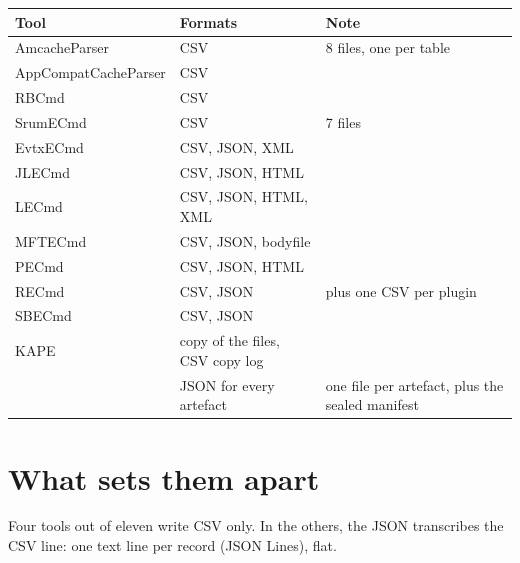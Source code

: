 \documentclass[11pt,a4paper,oneside]{report}
\begin{document}
\begin{longtable}{@{}L{4.4cm}L{5.4cm}L{5.2cm}@{}}
\toprule
\textbf{Tool} & \textbf{Formats} & \textbf{Note} \\
\midrule\endhead
AmcacheParser & CSV & 8 files, one per table \\
AppCompatCacheParser & CSV & \\
RBCmd & CSV & \\
SrumECmd & CSV & 7 files \\
EvtxECmd & CSV, JSON, XML & \\
JLECmd & CSV, JSON, HTML & \\
LECmd & CSV, JSON, HTML, XML & \\
MFTECmd & CSV, JSON, bodyfile & \\
PECmd & CSV, JSON, HTML & \\
RECmd & CSV, JSON & plus one CSV per plugin \\
SBECmd & CSV, JSON & \\
KAPE & copy of the files, CSV copy log & \\
\wac{} & JSON for every artefact & one file per artefact, plus the sealed manifest \\
\bottomrule
\end{longtable}

\section{What sets them apart}

Four tools out of eleven write CSV only. In the others, the JSON transcribes the
CSV line: one text line per record (JSON Lines), flat.
\end{document}
